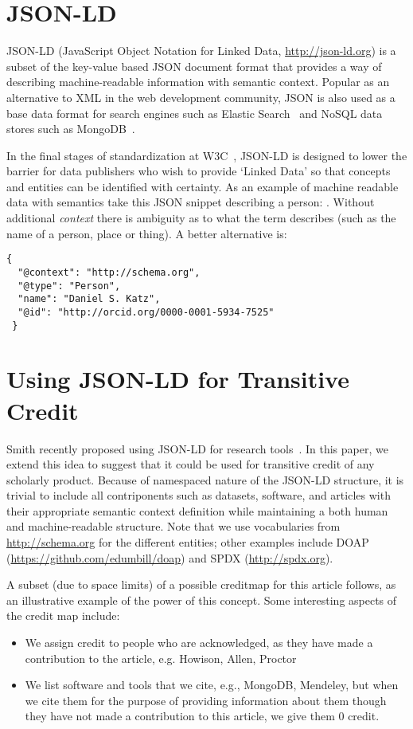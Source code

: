 \documentclass[a4paper,10pt]{article}
\begin{document}
\section{JSON-LD}


JSON-LD (JavaScript Object Notation for Linked Data, \url{http://json-ld.org}) is a subset of the key-value based JSON document format that provides a way of describing machine-readable information with semantic context. Popular as an alternative to XML in the web development community, JSON is also used as a base data format for search engines such as Elastic Search~\cite{elasticsearch} and NoSQL data stores such as MongoDB~\cite{mongodb}.

In the final stages of standardization at W3C~\cite{w3c}, JSON-LD is designed to lower the barrier for data publishers who wish to provide `Linked Data' so that concepts and entities can be identified with certainty. As an example of machine readable data with semantics take this JSON snippet describing a person: \jsonexample . Without additional \textit{context} there is ambiguity as to what the \name term describes (such as the name of a person, place or thing). A better alternative is:

{\footnotesize
\begin{verbatim}
{
  "@context": "http://schema.org",
  "@type": "Person",
  "name": "Daniel S. Katz",
  "@id": "http://orcid.org/0000-0001-5934-7525"
 }
\end{verbatim}
}


\section{Using JSON-LD for Transitive Credit}

Smith recently proposed using JSON-LD for research tools~\cite{arfon-json-ld-blog}. In this paper, we extend this idea to suggest that it could be used for transitive credit of any scholarly product. Because of namespaced nature of the JSON-LD structure, it is trivial to include all contriponents such as datasets, software, and articles with their appropriate semantic context definition while maintaining a both human and machine-readable structure. Note that we use vocabularies from \url{http://schema.org} for the different entities; other examples include DOAP (\url{https://github.com/edumbill/doap}) and SPDX (\url{http://spdx.org}).

A subset (due to space limits) of a possible creditmap for this article follows, as an illustrative example of the power of this concept. Some interesting aspects of the credit map include:
\begin{itemize}
\item We assign credit to people who are acknowledged, as they have made a contribution to the article, e.g. Howison, Allen, Proctor
\item We list software and tools that we cite, e.g., MongoDB, Mendeley, but when we cite them for the purpose of providing information about them though they have not made a contribution to this article, we give them 0 credit.
\end{itemize}
\end{document}
